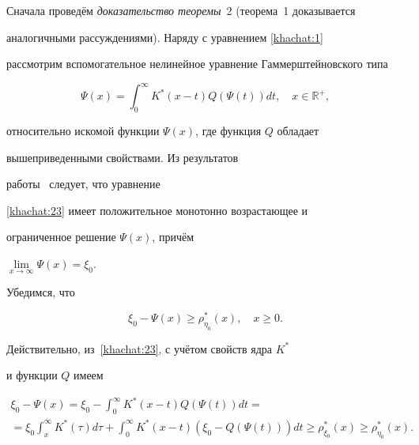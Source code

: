 \smallskip






Сначала проведём \textit{доказательство теоремы}~2 (теорема~1 доказывается

аналогичными рассуждениями). Наряду с уравнением \eqref{khachat:1}

рассмотрим вспомогательное нелинейное уравнение Гаммерштейновского типа

\begin{equation}

\Psi(x)=\int _{0}^{\infty}K^*(x-t)Q(\Psi(t))dt,\quad

x\in\mathbb{R}^+, \label{khachat:23}

\end{equation}

относительно искомой функции $\Psi(x)$, где функция $Q$ обладает

вышеприведенными свойствами. Из результатов

работы~\cite{popovkoval:bib:Khachatryana} следует, что уравнение

\eqref{khachat:23} имеет положительное монотонно возрастающее и

ограниченное решение $\Psi(x)$, причём 

$\lim\limits_{x\rightarrow\infty}\Psi(x)=\xi_0.$



Убедимся, что

\begin{equation}

\xi_0-\Psi(x)\geq\rho_{\eta_0}^*(x),\quad

x\geq0.\label{khachat:24}

\end{equation}

Действительно, из~\eqref{khachat:23}, с учётом свойств ядра $K^*$

и функции $Q$ имеем \pagebreak

\begin{multline*}

\xi_0-\Psi(x)=\xi_0-\int _{0}^{\infty}K^*(x-t)Q(\Psi(t))dt=\\

=\xi_0\int _{x}^{\infty}K^*(\tau)d\tau+\int _{0}^{\infty}K^*(x-t)(\xi_0-Q(\Psi(t)))dt\geq\rho_{\xi_0}^*(x)\geq\rho_{\eta_0}^*(x).

\end{multline*}



